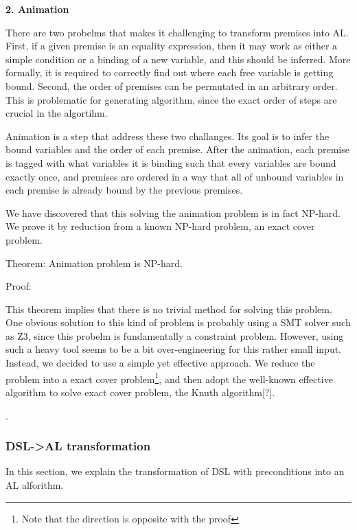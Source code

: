 

\textbf{2. Animation}

There are two probelms that makes it challenging to transform premises into AL.
First, if a given premise is an equality expression, then it may work as either a simple condition or
a binding of a new variable, and this should be inferred. More formally, it is required to
correctly find out where each free variable is getting bound. Second, the order
of premises can be permutated in an arbitrary order. This is problematic for
generating algorithm, since the exact order of steps are crucial in the algortihm.

Animation is a step that address these two challanges. Its goal is to infer
the bound variables and the order of each premise.
After the animation, each premise is tagged with what variables it is binding
such that every variables are bound exactly once, and premises are ordered in a way that
all of unbound variables in each premise is already bound by the previous premises.

We have discovered that this solving the animation problem is in fact NP-hard.
We prove it by reduction from a known NP-hard problem, an exact cover problem.

Theorem: Animation problem is NP-hard.

Proof: 

This theorem implies that there is no trivial method for solving this problem.
One obvious solution to this kind of problem is probably using a SMT solver such as Z3, since
this probelm is fundamentally a constraint problem.
However, using such a heavy tool seems to be a bit over-engineering for this rather small input.
Instead, we decided to use a simple yet effective approach.
We reduce the problem into a exact cover problem\footnote{Note that the direction is opposite with
the proof}, and then adopt the well-known effective algorithm to solve exact cover problem,
the Knuth algorithm[?].

.


\subsubsection{DSL->AL transformation}

In this section, we explain the transformation of DSL with preconditions into an AL alforithm.


